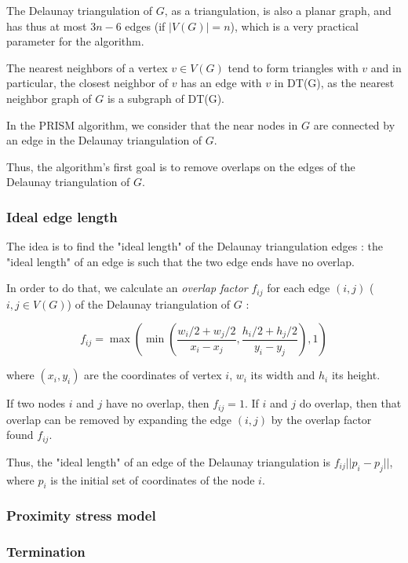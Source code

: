 \documentclass[12pt]{report}
\begin{document}
The Delaunay triangulation of $G$, as a triangulation, is also a planar graph, and has thus at most $3n -6$ edges (if $|V(G)| = n$), which is a very practical parameter for the algorithm.

\bigskip

The nearest neighbors of a vertex $v \in V(G)$ tend to form triangles with $v$ and in particular, the closest neighbor of $v$ has an edge with $v$ in DT(G), as the nearest neighbor graph of $G$ is a subgraph of DT(G).

In the PRISM algorithm, we consider that the near nodes in $G$ are connected by an edge in the Delaunay triangulation of $G$.

Thus, the algorithm's first goal is to remove overlaps on the edges of the Delaunay triangulation of $G$.

\subsubsection{Ideal edge length}
The idea is to find the "ideal length" of the Delaunay triangulation edges : the "ideal length" of an edge is such that the two edge ends have no overlap.

\bigskip
In order to do that, we calculate an \emph{overlap factor} $f_{ij}$ for each edge $(i,j)$ ($i,j \in V(G)$) of the Delaunay triangulation of $G$ :

\[ f_{ij} = \max ( \min (\frac{w_i/2 + w_j/2}{x_i - x_j}, 
\frac{h_i/2 + h_j/2}{y_i - y_j}), 1)\]

where $(x_i,y_i)$ are the coordinates of vertex $i$, $w_i$ its width and $h_i$ its height.

If two nodes $i$ and $j$ have no overlap, then $f_{ij} = 1$. 
If $i$ and $j$ do overlap, then that overlap can be removed by expanding the edge $(i,j)$ by the overlap factor found $f_{ij}$. %

Thus, the "ideal length" of an edge of the Delaunay triangulation is $f_{ij}||p_i - p_j||$, where $p_i$ is the initial set of coordinates of the node $i$.



\subsubsection{Proximity stress model}

\subsubsection{Termination}
\end{document}
